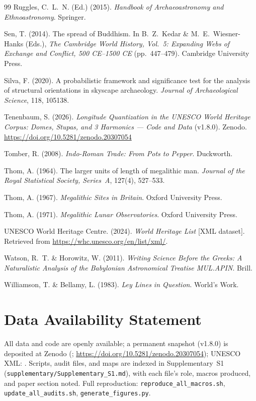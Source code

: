 \begin{thebibliography}{99}
Ruggles, C.~L.~N. (Ed.) (2015).
\textit{Handbook of Archaeoastronomy and Ethnoastronomy}.
Springer.

Sen, T. (2014).
The spread of Buddhism.
In B.~Z.~Kedar \& M.~E.~Wiesner-Hanks (Eds.),
\textit{The Cambridge World History, Vol.~5: Expanding Webs of Exchange
and Conflict, 500 CE--1500 CE} (pp.~447--479).
Cambridge University Press.

Silva, F. (2020).
A probabilistic framework and significance test for the analysis
of structural orientations in skyscape archaeology.
\textit{Journal of Archaeological Science}, 118, 105138.

Tenenbaum, S. (2026).
\textit{Longitude Quantization in the UNESCO World Heritage Corpus: Domes, Stupas, and 3\textdegree{} Harmonics --- Code and Data} (v1.8.0).
Zenodo. \url{https://doi.org/10.5281/zenodo.20307054}

Tomber, R. (2008).
\textit{Indo-Roman Trade: From Pots to Pepper}.
Duckworth.

Thom, A. (1964).
The larger units of length of megalithic man.
\textit{Journal of the Royal Statistical Society, Series~A}, 127(4), 527--533.

Thom, A. (1967).
\textit{Megalithic Sites in Britain}.
Oxford University Press.

Thom, A. (1971).
\textit{Megalithic Lunar Observatories}.
Oxford University Press.

{UNESCO World Heritage Centre}. (2024).
\textit{World Heritage List} [XML dataset].
Retrieved from \url{https://whc.unesco.org/en/list/xml/}.

Watson, R.~T. \& Horowitz, W. (2011).
\textit{Writing Science Before the Greeks: A Naturalistic Analysis of the
Babylonian Astronomical Treatise MUL.APIN}.
Brill.

Williamson, T. \& Bellamy, L. (1983).
\textit{Ley Lines in Question}.
World's Work.

\end{thebibliography}


\section*{Data Availability Statement}
\label{sec:data_code}
All data and code are openly available; a permanent snapshot (v1.8.0) is
deposited at Zenodo (\citealt{tenenbaum2026audit};
\url{https://doi.org/10.5281/zenodo.20307054}); UNESCO XML: \citealt{unescowhc2024xml}.
Scripts, audit files, and maps are indexed in
Supplementary~S1 (\texttt{supplementary/Supplementary\_S1.md}), with each
file's role, macros produced, and paper section noted.
Full reproduction: \texttt{reproduce\_all\_macros.sh},
\texttt{update\_all\_audits.sh}, \texttt{generate\_figures.py}.

